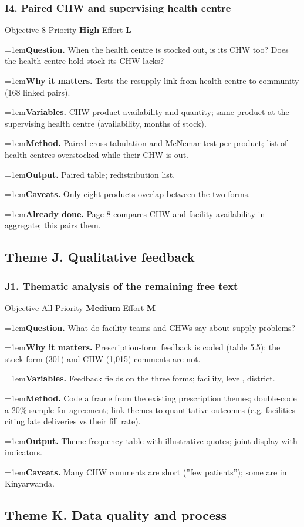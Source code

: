 \documentclass[10pt,a4paper]{article}
\newcommand{\field}[2]{\par\hangindent=1em\textbf{#1.} #2}
\begin{document}
\subsubsection*{I4. Paired CHW and supervising health centre}
{\footnotesize\color{gray} Objective 8 \textperiodcentered{} Priority \textbf{High} \textperiodcentered{} Effort \textbf{L}}
\field{Question}{When the health centre is stocked out, is its CHW too? Does the health centre hold stock its CHW lacks?}
\field{Why it matters}{Tests the resupply link from health centre to community (168 linked pairs).}
\field{Variables}{CHW product availability and quantity; same product at the supervising health centre (availability, months of stock).}
\field{Method}{Paired cross-tabulation and McNemar test per product; list of health centres overstocked while their CHW is out.}
\field{Output}{Paired table; redistribution list.}
\field{Caveats}{Only eight products overlap between the two forms.}
\field{Already done}{Page 8 compares CHW and facility availability in aggregate; this pairs them.}
\subsection{Theme J. Qualitative feedback}
\subsubsection*{J1. Thematic analysis of the remaining free text}
{\footnotesize\color{gray} Objective All \textperiodcentered{} Priority \textbf{Medium} \textperiodcentered{} Effort \textbf{M}}
\field{Question}{What do facility teams and CHWs say about supply problems?}
\field{Why it matters}{Prescription-form feedback is coded (table 5.5); the stock-form (301) and CHW (1,015) comments are not.}
\field{Variables}{Feedback fields on the three forms; facility, level, district.}
\field{Method}{Code a frame from the existing prescription themes; double-code a 20\% sample for agreement; link themes to quantitative outcomes (e.g. facilities citing late deliveries vs their fill rate).}
\field{Output}{Theme frequency table with illustrative quotes; joint display with indicators.}
\field{Caveats}{Many CHW comments are short (''few patients''); some are in Kinyarwanda.}
\subsection{Theme K. Data quality and process}
\end{document}
